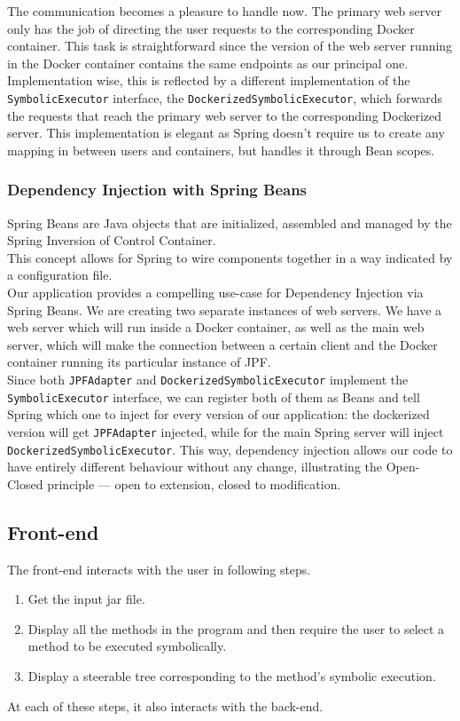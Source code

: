 \documentclass[titlepage,11pt]{article}
\begin{document}
The communication becomes a pleasure to handle now. The primary web server only has the job of directing the user requests to the corresponding Docker container. This task is straightforward since the version of the web server running in the Docker container contains the same endpoints as our principal one. \\

Implementation wise, this is reflected by a different implementation of the \texttt{SymbolicExecutor} interface, the \texttt{DockerizedSymbolicExecutor}, which forwards the requests that reach the primary web server to the corresponding Dockerized server.
This implementation is elegant as Spring doesn't require us to create any mapping in between users and containers, but handles it through Bean scopes.

\subsubsection{Dependency Injection with Spring Beans}

Spring Beans are Java objects that are initialized, assembled and managed by the Spring Inversion of Control Container. \\

This concept allows for Spring to wire components together in a way indicated by a configuration file. \\

Our application provides a compelling use-case for Dependency Injection via Spring Beans. We are creating two separate instances of web servers. We have a web server which will run inside a Docker container, as well as the main web server, which will make the connection between a certain client and the Docker container running its particular instance of JPF. \\

Since both \texttt{JPFAdapter} and \texttt{DockerizedSymbolicExecutor} implement the \texttt{SymbolicExecutor} interface, we can register both of them as Beans and tell Spring which one to inject for every version of our application: the dockerized version will get \texttt{JPFAdapter} injected, while for the main Spring server will inject \texttt{DockerizedSymbolicExecutor}. This way, dependency injection allows our code to have entirely different behaviour without any change, illustrating the Open-Closed principle --- open to extension, closed to modification.

\subsection{Front-end} 
The front-end interacts with the user in following steps.
\begin{enumerate}
\item Get the input jar file.
\item Display all the methods in the program and then require the user to select a method to be executed symbolically.
\item Display a steerable tree corresponding to the method's symbolic execution. 
\end{enumerate}
At each of these steps, it also interacts with the back-end.
\end{document}
